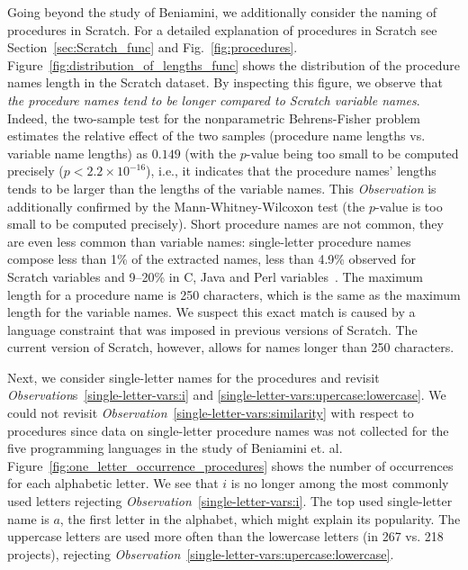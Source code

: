 \documentclass[conference]{IEEEtran}
\begin{document}
Going beyond the study of Beniamini, we additionally consider the naming of procedures in Scratch. 
For a detailed explanation of procedures in Scratch see Section~\ref{sec:Scratch_func} and Fig.~\ref{fig:procedures}. Figure~\ref{fig:distribution_of_lengths_func} shows the distribution of the procedure names length in the Scratch dataset. 
By inspecting this figure, we observe that \emph{the procedure names tend to be longer compared to Scratch variable names}.
Indeed, the two-sample test for the nonparametric Behrens-Fisher problem estimates the relative effect of the two samples (procedure name lengths vs. variable name lengths) as $0.149$ (with the $p$-value being too small to be computed precisely ($p < 2.2\times 10^{-16}$), i.e., it indicates that the procedure names' lengths tends to be larger than the lengths of the variable names. 
This \emph{Observation} is additionally confirmed by the Mann-Whitney-Wilcoxon test (the $p$-value is too small to be computed precisely).
Short procedure names are not common, they are even less common than variable names: single-letter procedure names compose less than 1\% of the extracted names, less than 4.9\% observed for Scratch variables and 9--20\% in C, Java and Perl variables~\cite{Beniamini}. 
The maximum length for a procedure name is 250 characters, which is the same as the maximum length for the variable names. 
We suspect this exact match is caused by a language constraint that was imposed in previous versions of Scratch. 
The current version of Scratch, however, allows for names longer than 250 characters. 

Next, we consider single-letter names for the procedures and revisit \emph{Observation}s~\ref{single-letter-vars:i} and \ref{single-letter-vars:upercase:lowercase}. 
We could not revisit \emph{Observation}~\ref{single-letter-vars:similarity} with respect to procedures since data on single-letter procedure names was not collected for the five programming languages in the study of Beniamini et. al.
Figure~\ref{fig:one_letter_occurrence_procedures} shows the number of occurrences for each alphabetic letter. 
We see that $i$ is no longer among the most commonly used letters rejecting \emph{Observation}~\ref{single-letter-vars:i}.
The top used single-letter name is $a$, the first letter in the alphabet, which might explain its popularity.
The uppercase letters are used more often than the lowercase letters (in 267 vs. 218 projects), rejecting \emph{Observation}~\ref{single-letter-vars:upercase:lowercase}.
\end{document}
